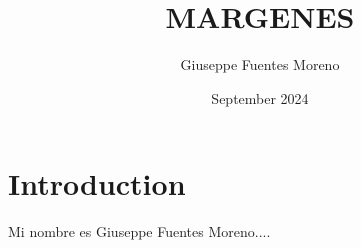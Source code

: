 \documentclass{article}
\title{MARGENES}
\author{Giuseppe Fuentes Moreno}
\date{September 2024}
\begin{document}

\maketitle

\section{Introduction}
Mi nombre es Giuseppe Fuentes Moreno....
\end{document}

